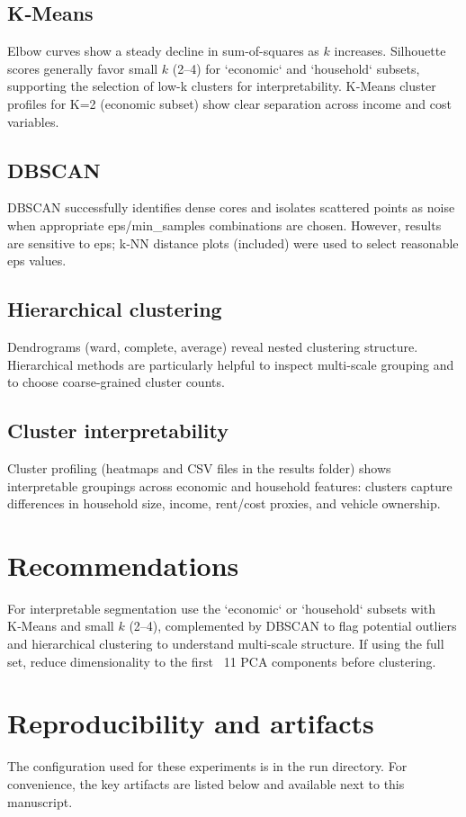 \documentclass[11pt,a4paper]{article}
\begin{document}
\subsection{K‑Means}
Elbow curves show a steady decline in sum-of-squares as $k$ increases. Silhouette scores generally favor small $k$ (2–4) for `economic` and `household` subsets, supporting the selection of low-k clusters for interpretability. K‑Means cluster profiles for K=2 (economic subset) show clear separation across income and cost variables.

\subsection{DBSCAN}
DBSCAN successfully identifies dense cores and isolates scattered points as noise when appropriate eps/min_samples combinations are chosen. However, results are sensitive to eps; k‑NN distance plots (included) were used to select reasonable eps values.

\subsection{Hierarchical clustering}
Dendrograms (ward, complete, average) reveal nested clustering structure. Hierarchical methods are particularly helpful to inspect multi-scale grouping and to choose coarse-grained cluster counts.

\subsection{Cluster interpretability}
Cluster profiling (heatmaps and CSV files in the results folder) shows interpretable groupings across economic and household features: clusters capture differences in household size, income, rent/cost proxies, and vehicle ownership.

\section{Recommendations}
For interpretable segmentation use the `economic` or `household` subsets with K‑Means and small $k$ (2–4), complemented by DBSCAN to flag potential outliers and hierarchical clustering to understand multi-scale structure. If using the full set, reduce dimensionality to the first ~11 PCA components before clustering.

\section{Reproducibility and artifacts}
The configuration used for these experiments is in the run directory. For convenience, the key artifacts are listed below and available next to this manuscript.
\end{document}
